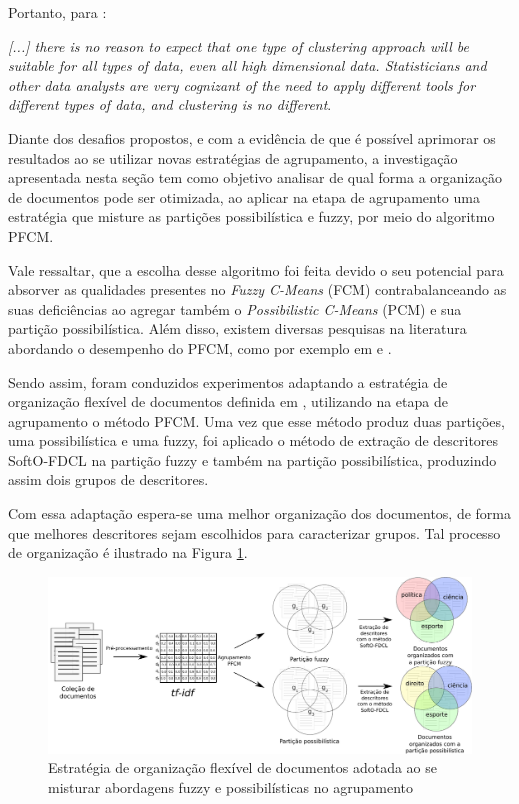 Portanto, para :
\begin{citacao}
  {\it [...] there is no reason to expect that one type of clustering approach will
  be suitable for all types of data, even all high dimensional data. Statisticians and other
  data analysts are very cognizant of the need to apply different tools for different types of
  data, and clustering is no different\/}.
\end{citacao}

Diante dos desafios propostos, e com a evidência de que é possível aprimorar os resultados ao
se utilizar novas estratégias de agrupamento, a investigação apresentada nesta seção tem como
objetivo analisar de qual forma a organização de documentos pode ser otimizada, ao aplicar na etapa
de agrupamento uma estratégia que misture as partições possibilística e fuzzy, por meio do algoritmo
PFCM. 

Vale ressaltar, que a escolha desse algoritmo foi feita devido o seu potencial para absorver as
qualidades presentes no {\it Fuzzy C-Means\/} (FCM) contrabalanceando as suas deficiências ao
agregar também o {\it Possibilistic C-Means\/} (PCM) e sua partição possibilística. Além disso,
existem diversas pesquisas na literatura abordando o desempenho do PFCM, como por exemplo em
 e .

Sendo assim, foram conduzidos experimentos adaptando a estratégia de organização flexível de documentos
definida em ,
utilizando na etapa de agrupamento o método PFCM. Uma vez que esse método produz duas partições, uma
possibilística e uma fuzzy, foi aplicado o método de extração de descritores
SoftO-FDCL na partição fuzzy e também na partição possibilística, produzindo assim dois grupos de
descritores. 

Com essa adaptação espera-se uma melhor organização dos documentos, de forma que melhores
descritores sejam escolhidos para caracterizar grupos. Tal processo de organização é ilustrado na
Figura \ref{fig:flexibleorganization}.

\begin{figure}[!htp] 
  \centering
  \includegraphics[width=1.0\columnwidth]{assets/process_pfcm.pdf} 
  \caption{Estratégia de organização flexível de documentos adotada ao se misturar abordagens fuzzy
  e possibilísticas no agrupamento} 
  \label{fig:flexibleorganization} 
\end{figure}

